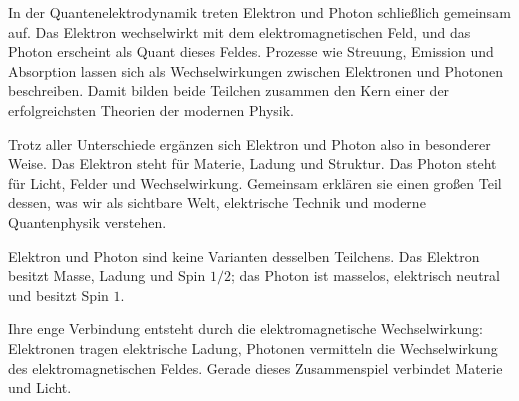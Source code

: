 In der Quantenelektrodynamik treten Elektron und Photon
schließlich gemeinsam auf. Das Elektron wechselwirkt mit dem elektromagnetischen Feld,
und das Photon erscheint als Quant dieses Feldes. Prozesse wie Streuung, Emission und
Absorption lassen sich als Wechselwirkungen zwischen Elektronen und Photonen
beschreiben. Damit bilden beide Teilchen zusammen den Kern einer der erfolgreichsten
Theorien der modernen Physik.

Trotz aller Unterschiede ergänzen sich Elektron und Photon also in besonderer Weise.
Das Elektron steht für Materie, Ladung und Struktur. Das Photon steht für Licht,
Felder und Wechselwirkung. Gemeinsam erklären sie einen großen Teil dessen, was wir
als sichtbare Welt, elektrische Technik und moderne Quantenphysik verstehen.

\begin{DidacticBox}
	\label{box:Elektron_Photon}
	Elektron und Photon sind keine Varianten desselben Teilchens. Das Elektron besitzt
	Masse, Ladung und Spin \(1/2\); das Photon ist masselos, elektrisch neutral und
	besitzt Spin \(1\).
	
	Ihre enge Verbindung entsteht durch die elektromagnetische Wechselwirkung:
	Elektronen tragen elektrische Ladung, Photonen vermitteln die Wechselwirkung des
	elektromagnetischen Feldes. Gerade dieses Zusammenspiel verbindet Materie und Licht.
\end{DidacticBox}